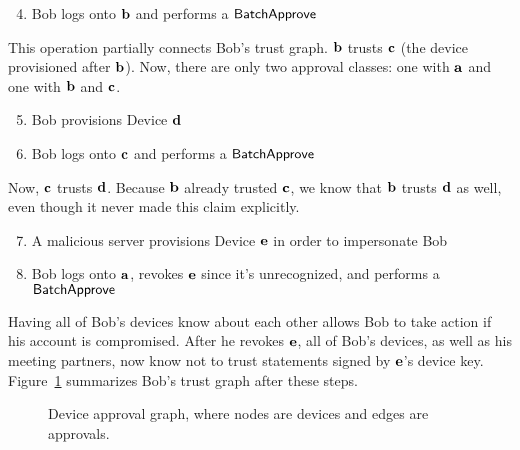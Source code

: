 \begin{enumerate}
  \setcounter{enumi}{3}
\item Bob logs onto $\mathbf{b}$ and performs a $\mathsf{BatchApprove}{}$
\end{enumerate}

This operation partially connects Bob's trust graph. $\mathbf{b}$ trusts $\mathbf{c}$ (the device
provisioned after $\mathbf{b}$). Now, there are only two approval classes: one with $\mathbf{a}$ and one
with $\mathbf{b}$ and $\mathbf{c}$.

\begin{enumerate}
  \setcounter{enumi}{4}
\item Bob provisions Device $\mathbf{d}$
\item Bob logs onto $\mathbf{c}$ and performs a $\mathsf{BatchApprove}{}$
\end{enumerate}

Now, $\mathbf{c}$ trusts $\mathbf{d}$. Because $\mathbf{b}$ already trusted $\mathbf{c}$, we know that
$\mathbf{b}$ trusts $\mathbf{d}$ as well, even though it never made this claim explicitly.

\begin{enumerate}
  \setcounter{enumi}{6}
\item A malicious server provisions Device $\mathbf{e}$ in order to impersonate Bob
\item Bob logs onto $\mathbf{a}$, revokes $\mathbf{e}$ since it's unrecognized, and performs a
    $\mathsf{BatchApprove}{}$
\end{enumerate}

Having all of Bob's devices know about each other allows Bob to take action if his account is
compromised. After he revokes $\mathbf{e}$, all of Bob's devices, as well as his meeting partners, now
know not to trust statements signed by $\mathbf{e}$'s device key. Figure~\ref{fig:devices} summarizes
Bob's trust graph after these steps.

\begin{figure}
\centering
{}
\caption{Device approval graph, where nodes are devices and edges are approvals.}
\label{fig:devices}
\end{figure}

